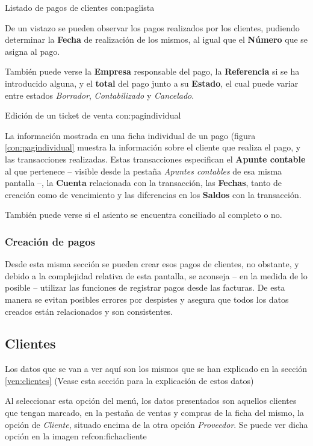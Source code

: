 {Listado de pagos de clientes}
{con:paglista}

De un vistazo se pueden observar los pagos realizados por los clientes, pudiendo determinar la \textbf{Fecha} de realización de los mismos, al igual que el \textbf{Número} que se asigna al pago.

También puede verse la \textbf{Empresa} responsable del pago, la \textbf{Referencia} si se ha introducido alguna, y el \textbf{total} del pago junto a su \textbf{Estado}, el cual puede variar entre estados \emph{Borrador}, \emph{Contabilizado} y \emph{Cancelado}.

{Edición de un ticket de venta}
{con:pagindividual}

La información mostrada en una ficha individual de un pago (figura \ref{con:pagindividual} muestra la información sobre el cliente que realiza el pago, y las transacciones realizadas. Estas transacciones especifican el \textbf{Apunte contable} al que pertenece -- visible desde la pestaña \emph{Apuntes contables} de esa misma pantalla --, la \textbf{Cuenta} relacionada con la transacción, las \textbf{Fechas}, tanto de creación como de vencimiento y las diferencias en los \textbf{Saldos} con la transacción.

También puede verse si el asiento se encuentra conciliado al completo o no.


\subsubsection{Creación de pagos}

Desde esta misma sección se pueden crear esos pagos de clientes, no obstante, y debido a la complejidad relativa de esta pantalla, se aconseja -- en la medida de lo posible -- utilizar las funciones de registrar pagos desde las facturas. De esta manera se evitan posibles errores por despistes y asegura que todos los datos creados están relacionados y son consistentes.





\subsection{Clientes}
Los datos que se van a ver aquí son los mismos que se han explicado en la sección \ref{ven:clientes} (Vease esta sección para la explicación
de estos datos)

Al seleccionar esta opción del menú, los datos presentados son aquellos clientes que tengan marcado, en la pestaña de ventas y compras de la ficha del mismo, la opción de \emph{Cliente}, situado encima de la otra opción \emph{Proveedor}. Se puede ver dicha opción en la imagen ref{con:fichacliente}

